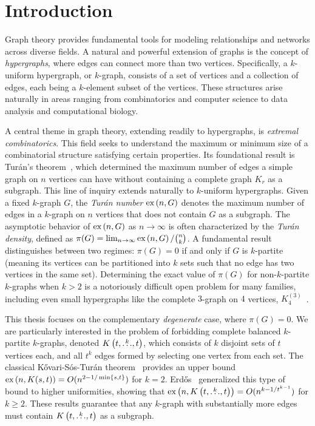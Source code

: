 
\section{Introduction}\label{sec:introduction}

Graph theory provides fundamental tools for modeling relationships and networks across diverse fields.
A natural and powerful extension of graphs is the concept of \emph{hypergraphs}, where edges can connect more than two vertices.
Specifically, a $k$-uniform hypergraph, or $k$-graph, consists of a set of vertices and a collection of edges, each being a $k$-element subset of the vertices.
These structures arise naturally in areas ranging from combinatorics and computer science to data analysis and computational biology.

A central theme in graph theory, extending readily to hypergraphs, is \emph{extremal combinatorics}.
This field seeks to understand the maximum or minimum size of a combinatorial structure satisfying certain properties.
Its foundational result is Turán's theorem~\cite{Turan1941},
which determined the maximum number of edges a simple graph on $n$
vertices can have without containing a complete graph $K_r$ as a subgraph.
This line of inquiry extends naturally to $k$-uniform hypergraphs.
Given a fixed $k$-graph $G$, the \emph{Turán number} $\text{ex} \left( n, G \right)$ denotes the maximum number of edges in a $k$-graph on $n$ vertices that does not contain $G$ as a subgraph.
The asymptotic behavior of $\text{ex} \left( n, G \right)$ as $n \to \infty$
is often characterized by the \emph{Turán density}, defined as $\pi(G) = \lim_{n \to \infty} \text{ex} \left( n, G \right) / \binom{n}{k}$.
A fundamental result distinguishes between two regimes: $\pi(G) = 0$ if and only if $G$ is $k$-partite
(meaning its vertices can be partitioned into $k$ sets such that no edge has two vertices in the same set).
Determining the exact value of $\pi(G)$ for non-$k$-partite $k$-graphs when $k > 2$
is a notoriously difficult open problem for many families, including even small hypergraphs like the complete $3$-graph on $4$ vertices,
$K_4^{(3)}$~\cite{keevash2011hypergraph, razborov20103}.

This thesis focuses on the complementary \emph{degenerate} case, where $\pi(G) = 0$.
We are particularly interested in the problem of forbidding complete balanced $k$-partite $k$-graphs,
denoted $K\left(t, \overset{k}{\dots}, t\right)$, which consists of $k$ disjoint sets of $t$ vertices each,
and all $t^k$ edges formed by selecting one vertex from each set.
The classical Kővari-Sós-Turán theorem~\cite{Kovari1954, Hylten1958} provides an upper bound $\text{ex} \left( n, K(s, t) \right) = O(n^{2 - 1/\min\{s,t\}})$ for $k=2$.
Erdős~\cite{Erods1964} generalized this type of bound to higher uniformities, showing that $\text{ex} \left( n, K\left(t, \overset{k}{\dots}, t\right) \right) = O(n^{k - 1/t^{k-1}})$ for $k \ge 2$.
These results guarantee that any $k$-graph with substantially more edges must contain $K\left(t, \overset{k}{\dots}, t\right)$ as a subgraph.

